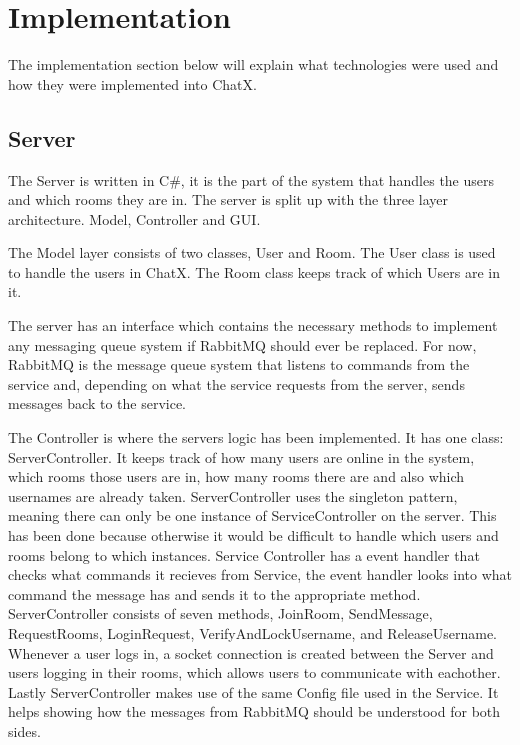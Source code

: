 \chapter{Implementation}

The implementation section below will explain what technologies were used and how they were implemented into ChatX.

\section{Server}

The Server is written in C\#, it is the part of the system that handles the users and which rooms they are in. The server is split up with the three layer architecture. Model, Controller and GUI. 


The Model layer consists of two classes, User and Room. The User class is used to handle the users in ChatX. The Room class keeps track of which Users are in it.


The server has an interface which contains the necessary methods to implement any messaging queue system if RabbitMQ should ever be replaced. For now, RabbitMQ is the message queue system that listens to commands from the service and, depending on what the service requests from the server, sends messages back to the service.

The Controller is where the servers logic has been implemented. It has one class: ServerController. It keeps track of how many users are online in the system, which rooms those users are in, how many rooms there are and also which usernames are already taken. ServerController uses the singleton pattern, meaning there can only be one instance of ServiceController on the server. This has been done because otherwise it would be difficult to handle which users and rooms belong to which instances. Service Controller has a event handler that checks what commands it recieves from Service, the event handler looks into what command the message has and sends it to the appropriate method. ServerController consists of seven methods, JoinRoom, SendMessage, RequestRooms, LoginRequest, VerifyAndLockUsername, and ReleaseUsername. Whenever a user logs in, a socket connection is created between the Server and users logging in their rooms, which allows users to communicate with eachother. Lastly ServerController makes use of the same Config file used in the Service. It helps showing how the messages from RabbitMQ should be understood for both sides.




